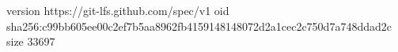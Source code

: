 version https://git-lfs.github.com/spec/v1
oid sha256:c99bb605ee00c2ef7b5aa8962fb4159148148072d2a1cec2c750d7a748ddad2c
size 33697
